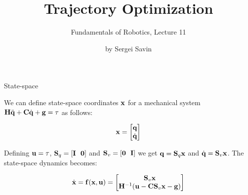 \documentclass{beamer}
\title{Trajectory Optimization}
\subtitle{Fundamentals of Robotics, Lecture 11}
\author{by Sergei Savin}
\date{\mydate}
\begin{document}
\maketitle





\begin{frame}{State-space}
	\begin{flushleft}
		
		We can define state-space coordinates $\mathbf{x}$ for a mechanical system $\mathbf{H} \ddot{\mathbf{q}} + \mathbf{C} \dot{\mathbf{q}} + \mathbf{g} = \tau$ as follows:
		
		\begin{equation}
			\mathbf{x} = \begin{bmatrix}
				\mathbf{q} \\
				\dot{\mathbf{q}}
			\end{bmatrix}
		\end{equation}
	
	Defining $\mathbf{u} = \tau$,  $\mathbf{S}_q = [\mathbf{I} \ \ \mathbf{0}]$ and $\mathbf{S}_v = [\mathbf{0} \ \ \mathbf{I}]$ we get $\mathbf{q} = \mathbf{S}_q \mathbf{x}$ and $\dot{\mathbf{q}} = \mathbf{S}_v \mathbf{x}$. The state-space dynamics becomes:
	
	
		\begin{equation}
				\dot{\mathbf{x}} = 
				\mathbf{f}(\mathbf{x}, \mathbf{u})
				=
		   \begin{bmatrix}
				\mathbf{S}_v \mathbf{x} \\
				\mathbf{H}^{-1} (\mathbf{u} - \mathbf{C} \mathbf{S}_v \mathbf{x} - \mathbf{g})
			\end{bmatrix}
		\end{equation}
	
	\end{flushleft}
\end{frame}
\end{document}
